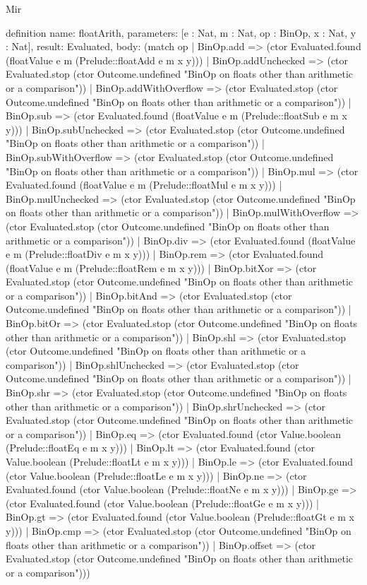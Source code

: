 \begin{lexlean}{Mir}
\begin{semanticmodule}
definition{
  name: floatArith,
  parameters: [e : Nat, m : Nat, op : BinOp, x : Nat, y : Nat],
  result: Evaluated,
  body: (match op
    | BinOp.add => (ctor Evaluated.found (floatValue e m (Prelude::floatAdd e m x y)))
    | BinOp.addUnchecked => (ctor Evaluated.stop (ctor Outcome.undefined "BinOp on floats other than arithmetic or a comparison"))
    | BinOp.addWithOverflow => (ctor Evaluated.stop (ctor Outcome.undefined "BinOp on floats other than arithmetic or a comparison"))
    | BinOp.sub => (ctor Evaluated.found (floatValue e m (Prelude::floatSub e m x y)))
    | BinOp.subUnchecked => (ctor Evaluated.stop (ctor Outcome.undefined "BinOp on floats other than arithmetic or a comparison"))
    | BinOp.subWithOverflow => (ctor Evaluated.stop (ctor Outcome.undefined "BinOp on floats other than arithmetic or a comparison"))
    | BinOp.mul => (ctor Evaluated.found (floatValue e m (Prelude::floatMul e m x y)))
    | BinOp.mulUnchecked => (ctor Evaluated.stop (ctor Outcome.undefined "BinOp on floats other than arithmetic or a comparison"))
    | BinOp.mulWithOverflow => (ctor Evaluated.stop (ctor Outcome.undefined "BinOp on floats other than arithmetic or a comparison"))
    | BinOp.div => (ctor Evaluated.found (floatValue e m (Prelude::floatDiv e m x y)))
    | BinOp.rem => (ctor Evaluated.found (floatValue e m (Prelude::floatRem e m x y)))
    | BinOp.bitXor => (ctor Evaluated.stop (ctor Outcome.undefined "BinOp on floats other than arithmetic or a comparison"))
    | BinOp.bitAnd => (ctor Evaluated.stop (ctor Outcome.undefined "BinOp on floats other than arithmetic or a comparison"))
    | BinOp.bitOr => (ctor Evaluated.stop (ctor Outcome.undefined "BinOp on floats other than arithmetic or a comparison"))
    | BinOp.shl => (ctor Evaluated.stop (ctor Outcome.undefined "BinOp on floats other than arithmetic or a comparison"))
    | BinOp.shlUnchecked => (ctor Evaluated.stop (ctor Outcome.undefined "BinOp on floats other than arithmetic or a comparison"))
    | BinOp.shr => (ctor Evaluated.stop (ctor Outcome.undefined "BinOp on floats other than arithmetic or a comparison"))
    | BinOp.shrUnchecked => (ctor Evaluated.stop (ctor Outcome.undefined "BinOp on floats other than arithmetic or a comparison"))
    | BinOp.eq => (ctor Evaluated.found (ctor Value.boolean (Prelude::floatEq e m x y)))
    | BinOp.lt => (ctor Evaluated.found (ctor Value.boolean (Prelude::floatLt e m x y)))
    | BinOp.le => (ctor Evaluated.found (ctor Value.boolean (Prelude::floatLe e m x y)))
    | BinOp.ne => (ctor Evaluated.found (ctor Value.boolean (Prelude::floatNe e m x y)))
    | BinOp.ge => (ctor Evaluated.found (ctor Value.boolean (Prelude::floatGe e m x y)))
    | BinOp.gt => (ctor Evaluated.found (ctor Value.boolean (Prelude::floatGt e m x y)))
    | BinOp.cmp => (ctor Evaluated.stop (ctor Outcome.undefined "BinOp on floats other than arithmetic or a comparison"))
    | BinOp.offset => (ctor Evaluated.stop (ctor Outcome.undefined "BinOp on floats other than arithmetic or a comparison")))
}


\end{semanticmodule}
\end{lexlean}
